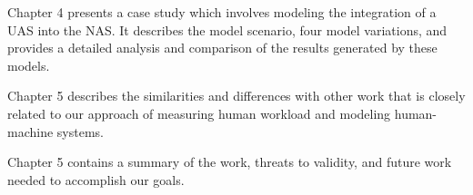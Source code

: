 Chapter 4 presents a case study which involves modeling the integration of a UAS into the NAS.  It describes the model scenario, four model variations, and provides a detailed analysis and comparison of the results generated by these models.

Chapter 5 describes the similarities and differences with other work that is closely related to our approach of measuring human workload and modeling human-machine systems.

Chapter 5 contains a summary of the work, threats to validity, and future work needed to accomplish our goals.

\begin{comment}
The appendices include the initial WiSAR proposal, the core modeling framework classes, an XML model, and simulation logs.
\end{comment}